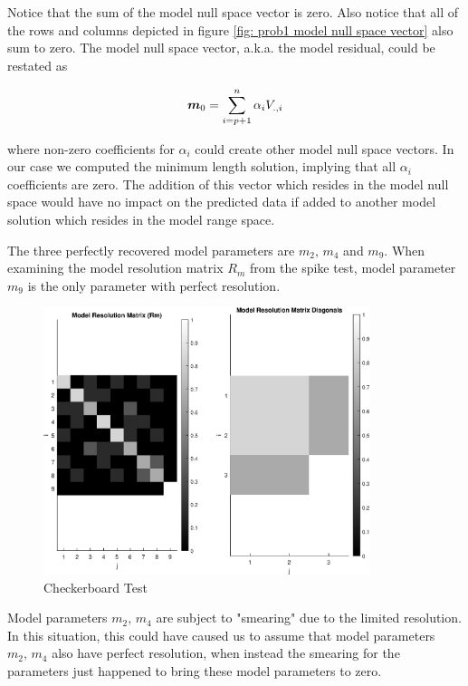 Notice that the sum of the model null space vector is zero. Also notice that all of the rows and columns depicted in figure \ref{fig: prob1 model null space vector} also sum to zero. The model null space vector, a.k.a. the model residual, could be restated as

\begin{align*}
	\boldsymbol{m}_0 = \sum_{i = p + 1}^{n} \alpha_i V_{.,i}
\end{align*}

where non-zero coefficients for $\alpha_i$ could create other model null space vectors. In our case we computed the minimum length solution, implying that all $\alpha_i$ coefficients are zero. The addition of this vector which resides in the model null space would have no impact on the predicted data if added to another model solution which resides in the model range space.

The three perfectly recovered model parameters are $m_2,\,m_4$ and $m_9$. When examining the model resolution matrix $R_m$ from the spike test, model parameter $m_9$ is the only parameter with perfect resolution. 

\begin{figure}[h] 
	\centering
	\includegraphics[width=0.85\textwidth]{./images/prob1_Rm.eps}
	\caption{Checkerboard Test}
	\label{fig: prob1 Rm}
\end{figure}
\FloatBarrier

Model parameters $m_2,\,m_4$ are subject to "smearing" due to the limited resolution. In this situation, this could have caused us to assume that model parameters $m_2,\,m_4$ also have perfect resolution, when instead the smearing for the parameters just happened to bring these model parameters to zero.

